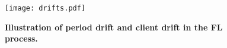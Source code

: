 \begin{figure}[h]
    \centering
    \texttt{[image: drifts.pdf]}
    \caption{\textbf{Illustration of period drift and client drift in the FL process.}}
    \label{fig:drifts}
\end{figure}



